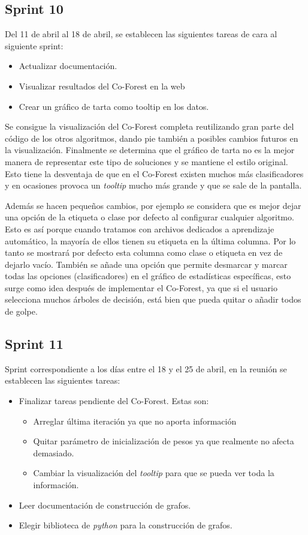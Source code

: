 \subsection{Sprint 10}
Del 11 de abril al 18 de abril, se establecen las siguientes tareas de cara al siguiente sprint:
 \begin{itemize}
	\item Actualizar documentación.
	\item Visualizar resultados del Co-Forest en la web
	\item Crear un gráfico de tarta como tooltip en los datos.
\end{itemize}
Se consigue la visualización del Co-Forest completa reutilizando gran parte del código de los otros algoritmos, dando pie también a posibles cambios futuros en la visualización. Finalmente se determina que el gráfico de tarta no es la mejor manera de representar este tipo de soluciones y se mantiene el estilo original. Esto tiene la desventaja de que en el Co-Forest existen muchos más clasificadores y en ocasiones provoca un \textit{tooltip} mucho más grande y que se sale de la pantalla. 

Además se hacen pequeños cambios, por ejemplo se considera que es mejor dejar una opción de la etiqueta o clase por defecto al configurar cualquier algoritmo. Esto es así porque cuando tratamos con archivos dedicados a aprendizaje automático, la mayoría de ellos tienen su etiqueta en la última columna. Por lo tanto se mostrará por defecto esta columna como clase o etiqueta en vez de dejarlo vacío. También se añade una opción que permite desmarcar y marcar todas las opciones (clasificadores) en el gráfico de estadísticas específicas, esto surge como idea después de implementar el Co-Forest, ya que si el usuario selecciona muchos árboles de decisión, está bien que pueda quitar o añadir  todos de golpe.

\subsection{Sprint 11}
Sprint correspondiente a los días entre el 18 y el 25 de abril, en la reunión se establecen las siguientes tareas:
 \begin{itemize}
	\item Finalizar tareas pendiente del Co-Forest. Estas son:
	\begin{itemize}
		\item Arreglar última iteración ya que no aporta información
		\item Quitar parámetro de inicialización de pesos ya que realmente no afecta demasiado.
		\item Cambiar la visualización del \textit{tooltip} para que se pueda ver toda la información.
	\end{itemize}
	\item Leer documentación de construcción de grafos.
	\item Elegir biblioteca de \textit{python} para la construcción de grafos.
\end{itemize}

